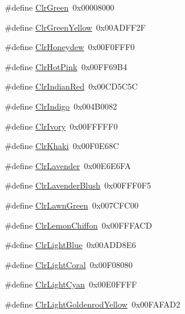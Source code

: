 \begin{DoxyCompactItemize}
\item 
\#define \hyperlink{group__primitives__api_ga502a4632567d6f0904d2a6a1c61f3bf9}{Clr\+Green}~0x00008000
\item 
\#define \hyperlink{group__primitives__api_ga21eda82d5e628fc177fbf431ded43ead}{Clr\+Green\+Yellow}~0x00\+A\+D\+F\+F2\+F
\item 
\#define \hyperlink{group__primitives__api_ga1251c35b473aaf76bc826c63ee64b0d8}{Clr\+Honeydew}~0x00\+F0\+F\+F\+F0
\item 
\#define \hyperlink{group__primitives__api_gac3cef8aa2896d6104688b467dc152317}{Clr\+Hot\+Pink}~0x00\+F\+F69\+B4
\item 
\#define \hyperlink{group__primitives__api_ga9b41a6f3e769ae7dae744feee1c6f78f}{Clr\+Indian\+Red}~0x00\+C\+D5\+C5\+C
\item 
\#define \hyperlink{group__primitives__api_ga589da6a15859cca5c29f07cea814bee3}{Clr\+Indigo}~0x004\+B0082
\item 
\#define \hyperlink{group__primitives__api_gae20b332d2668eb533c1e918ac1614d96}{Clr\+Ivory}~0x00\+F\+F\+F\+F\+F0
\item 
\#define \hyperlink{group__primitives__api_ga89abd031b6e5a7ff3420c5061c732aec}{Clr\+Khaki}~0x00\+F0\+E68\+C
\item 
\#define \hyperlink{group__primitives__api_gaf80a152dca314b0c16b49df40c8b6dc0}{Clr\+Lavender}~0x00\+E6\+E6\+F\+A
\item 
\#define \hyperlink{group__primitives__api_ga149de525d163037f70ceaf7765761efd}{Clr\+Lavender\+Blush}~0x00\+F\+F\+F0\+F5
\item 
\#define \hyperlink{group__primitives__api_gaa5f4ac2916c776da5ebcca1bf4bee218}{Clr\+Lawn\+Green}~0x007\+C\+F\+C00
\item 
\#define \hyperlink{group__primitives__api_ga325958e7dcd255033400c073f37014bf}{Clr\+Lemon\+Chiffon}~0x00\+F\+F\+F\+A\+C\+D
\item 
\#define \hyperlink{group__primitives__api_ga3b5bcfdfe40182a0b38cfaf3b2e51368}{Clr\+Light\+Blue}~0x00\+A\+D\+D8\+E6
\item 
\#define \hyperlink{group__primitives__api_ga252afd45b835c6437d5c2957c0eb3726}{Clr\+Light\+Coral}~0x00\+F08080
\item 
\#define \hyperlink{group__primitives__api_ga64765825218e7db18a3f0bbb7eb9fa5b}{Clr\+Light\+Cyan}~0x00\+E0\+F\+F\+F\+F
\item 
\#define \hyperlink{group__primitives__api_ga40f223154f13a1a3d84d724092009028}{Clr\+Light\+Goldenrod\+Yellow}~0x00\+F\+A\+F\+A\+D2
\item 

\end{DoxyCompactItemize}

